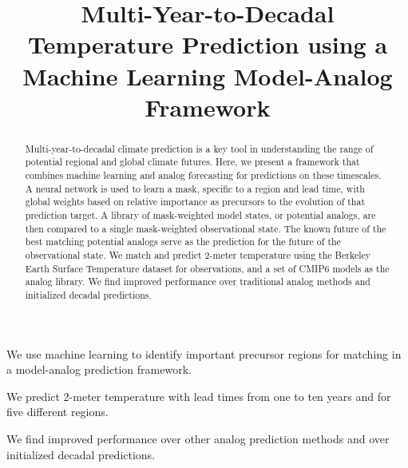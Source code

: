 \documentclass[draft]{agujournal2019}
\begin{document}
\title{Multi-Year-to-Decadal Temperature Prediction using a Machine Learning Model-Analog Framework}
\begin{keypoints}
\item We use machine learning to identify important precursor regions for matching in a model-analog prediction framework.
\item We predict 2-meter temperature with lead times from one to ten years and for five different regions.
\item We find improved performance over other analog prediction methods and over initialized decadal predictions.
\end{keypoints}
\begin{abstract}
Multi-year-to-decadal climate prediction is a key tool in understanding the range of potential regional and global climate futures.
Here, we present a framework that combines machine learning and analog forecasting for predictions on these timescales.
A neural network is used to learn a mask, specific to a region and lead time, with global weights based on relative importance as precursors to the evolution of that prediction target.
A library of mask-weighted model states, or potential analogs, are then compared to a single mask-weighted observational state.
The known future of the best matching potential analogs serve as the prediction for the future of the observational state.
We match and predict 2-meter temperature using the Berkeley Earth Surface Temperature dataset for observations, and a set of CMIP6 models as the analog library.
We find improved performance over traditional analog methods and initialized decadal predictions.
\end{abstract}
\end{document}
